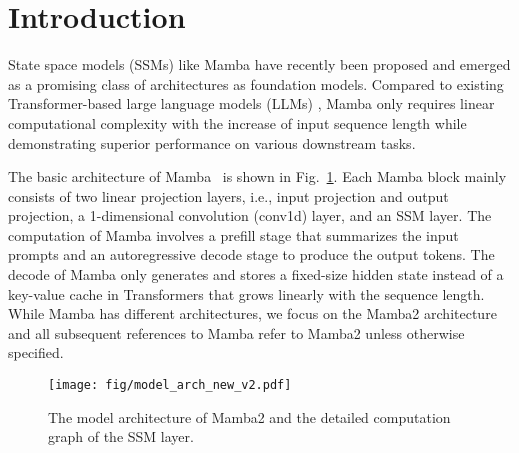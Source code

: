 \section{Introduction}
\label{sec:introduction}

State space models (SSMs) like Mamba \cite{gu2023mamba,dao2024transformers} have recently been proposed
and emerged as a promising class of architectures as foundation models. Compared to existing Transformer-based
large language models (LLMs) \cite{touvron2023llama,touvron2023llama2,bubeck2023sparks,jiang2024mixtral},
Mamba only requires linear computational complexity with the increase of input sequence length while demonstrating
superior performance on various downstream tasks. 


The basic architecture 
of Mamba~\cite{dao2024transformers} is shown in Fig.~\ref{fig:model_arch}. Each Mamba block mainly consists of two linear projection layers,
i.e., input projection and output projection, a 1-dimensional convolution (conv1d) layer, and an SSM layer. The computation of
Mamba involves a prefill stage that summarizes the input prompts and an autoregressive decode stage to produce the output tokens.
The decode of Mamba only generates and stores a fixed-size hidden state instead of a key-value cache in Transformers
that grows linearly with the sequence length. While Mamba has different architectures, we focus on the
Mamba2 \cite{dao2024transformers} architecture and all subsequent references to Mamba refer to Mamba2 unless otherwise specified.

\begin{figure}[!tb]
\centering
\texttt{[image: fig/model\_arch\_new\_v2.pdf]}
\caption{The model architecture of Mamba2 and the detailed
computation graph of the SSM layer.} 
\vspace{-10pt}
\label{fig:model_arch}
\end{figure}


